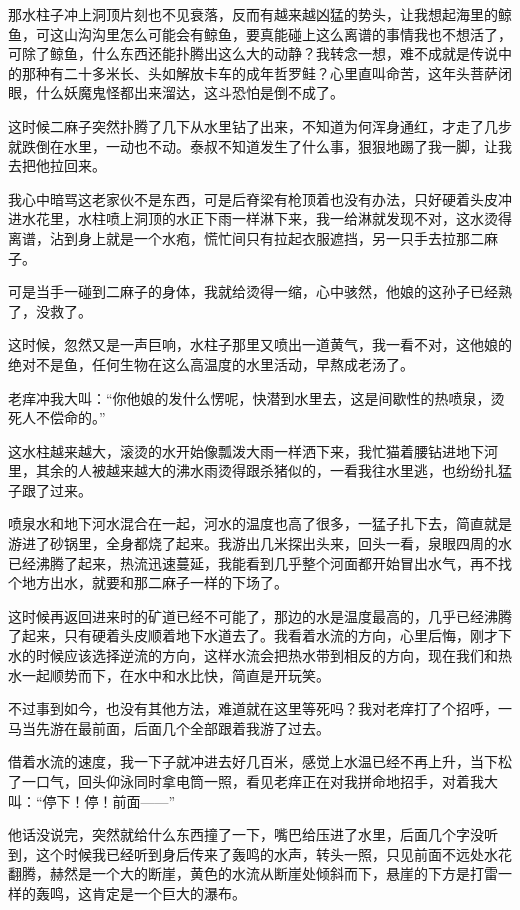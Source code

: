 那水柱子冲上洞顶片刻也不见衰落，反而有越来越凶猛的势头，让我想起海里的鲸鱼，可这山沟沟里怎么可能会有鲸鱼，要真能碰上这么离谱的事情我也不想活了，可除了鲸鱼，什么东西还能扑腾出这么大的动静？我转念一想，难不成就是传说中的那种有二十多米长、头如解放卡车的成年哲罗鲑？心里直叫命苦，这年头菩萨闭眼，什么妖魔鬼怪都出来溜达，这斗恐怕是倒不成了。

这时候二麻子突然扑腾了几下从水里钻了出来，不知道为何浑身通红，才走了几步就跌倒在水里，一动也不动。泰叔不知道发生了什么事，狠狠地踢了我一脚，让我去把他拉回来。

我心中暗骂这老家伙不是东西，可是后脊梁有枪顶着也没有办法，只好硬着头皮冲进水花里，水柱喷上洞顶的水正下雨一样淋下来，我一给淋就发现不对，这水烫得离谱，沾到身上就是一个水疱，慌忙间只有拉起衣服遮挡，另一只手去拉那二麻子。

可是当手一碰到二麻子的身体，我就给烫得一缩，心中骇然，他娘的这孙子已经熟了，没救了。

这时候，忽然又是一声巨响，水柱子那里又喷出一道黄气，我一看不对，这他娘的绝对不是鱼，任何生物在这么高温度的水里活动，早熬成老汤了。

老痒冲我大叫：“你他娘的发什么愣呢，快潜到水里去，这是间歇性的热喷泉，烫死人不偿命的。”

这水柱越来越大，滚烫的水开始像瓢泼大雨一样洒下来，我忙猫着腰钻进地下河里，其余的人被越来越大的沸水雨烫得跟杀猪似的，一看我往水里逃，也纷纷扎猛子跟了过来。

喷泉水和地下河水混合在一起，河水的温度也高了很多，一猛子扎下去，简直就是游进了砂锅里，全身都烧了起来。我游出几米探出头来，回头一看，泉眼四周的水已经沸腾了起来，热流迅速蔓延，我能看到几乎整个河面都开始冒出水气，再不找个地方出水，就要和那二麻子一样的下场了。

这时候再返回进来时的矿道已经不可能了，那边的水是温度最高的，几乎已经沸腾了起来，只有硬着头皮顺着地下水道去了。我看着水流的方向，心里后悔，刚才下水的时候应该选择逆流的方向，这样水流会把热水带到相反的方向，现在我们和热水一起顺势而下，在水中和水比快，简直是开玩笑。

不过事到如今，也没有其他方法，难道就在这里等死吗？我对老痒打了个招呼，一马当先游在最前面，后面几个全部跟着我游了过去。

借着水流的速度，我一下子就冲进去好几百米，感觉上水温已经不再上升，当下松了一口气，回头仰泳同时拿电筒一照，看见老痒正在对我拼命地招手，对着我大叫：“停下！停！前面——”

他话没说完，突然就给什么东西撞了一下，嘴巴给压进了水里，后面几个字没听到，这个时候我已经听到身后传来了轰鸣的水声，转头一照，只见前面不远处水花翻腾，赫然是一个大的断崖，黄色的水流从断崖处倾斜而下，悬崖的下方是打雷一样的轰鸣，这肯定是一个巨大的瀑布。

